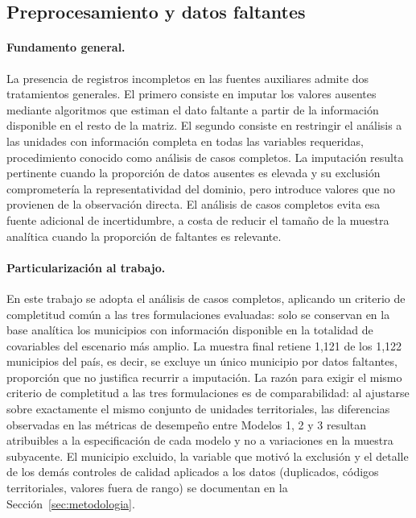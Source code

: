 \subsection{Preprocesamiento y datos faltantes}

\paragraph{Fundamento general.}
La presencia de registros incompletos en las fuentes auxiliares admite dos tratamientos generales. El primero consiste en imputar los valores ausentes mediante algoritmos que estiman el dato faltante a partir de la información disponible en el resto de la matriz. El segundo consiste en restringir el análisis a las unidades con información completa en todas las variables requeridas, procedimiento conocido como análisis de casos completos. La imputación resulta pertinente cuando la proporción de datos ausentes es elevada y su exclusión comprometería la representatividad del dominio, pero introduce valores que no provienen de la observación directa. El análisis de casos completos evita esa fuente adicional de incertidumbre, a costa de reducir el tamaño de la muestra analítica cuando la proporción de faltantes es relevante.

\paragraph{Particularización al trabajo.}
En este trabajo se adopta el análisis de casos completos, aplicando un criterio de completitud común a las tres formulaciones evaluadas: solo se conservan en la base analítica los municipios con información disponible en la totalidad de covariables del escenario más amplio. La muestra final retiene 1{,}121 de los 1{,}122 municipios del país, es decir, se excluye un único municipio por datos faltantes, proporción que no justifica recurrir a imputación. La razón para exigir el mismo criterio de completitud a las tres formulaciones es de comparabilidad: al ajustarse sobre exactamente el mismo conjunto de unidades territoriales, las diferencias observadas en las métricas de desempeño entre Modelos 1, 2 y 3 resultan atribuibles a la especificación de cada modelo y no a variaciones en la muestra subyacente. El municipio excluido, la variable que motivó la exclusión y el detalle de los demás controles de calidad aplicados a los datos (duplicados, códigos territoriales, valores fuera de rango) se documentan en la Sección~\ref{sec:metodologia}.

